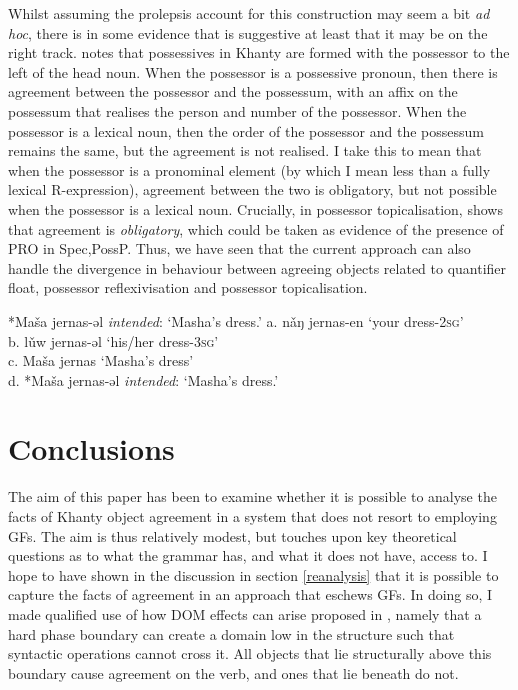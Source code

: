 \documentclass[output=paper
,modfonts
,nonflat]{langsci/langscibook}
\begin{document}
Whilst assuming the prolepsis account for this construction may seem a bit \emph{ad hoc}, there is in some evidence that is suggestive at least that it may be on the right track. 
\citet[][345]{nikolaeva1999} notes that possessives in Khanty are formed with the possessor to the left of the head noun. 
When the possessor is a possessive pronoun, then there is agreement between the possessor and the possessum, with an affix on the possessum that realises the person and number of the possessor.
When the possessor is a lexical noun, then the order of the possessor and the possessum remains the same, but the agreement is not realised.
I take this to mean that when the possessor is a pronominal element (by which I mean less than a fully lexical R-expression), agreement between the two is obligatory, but not possible when the possessor is a lexical noun. Crucially, in possessor topicalisation, \citeauthor{nikolaeva1999} shows that agreement is \emph{obligatory}, which could be taken as evidence of the presence of PRO in Spec,PossP.  
Thus, we have seen that the current approach can also handle the divergence in behaviour between agreeing objects related to quantifier float, possessor reflexivisation and possessor topicalisation.

\begin{exe}
	\ex
	\begin{tabbing}
		*Ma\v{s}a jernas-əl\hspace{10mm} \= \emph{intended}: `Masha's dress.'\kill
				a.	n\v{a}ŋ jernas-en			\> 	`your dress-\textsc{2sg}'\\
		b.	l\v{u}w jernas-əl 	\>	`his/her dress-\textsc{3sg}'\\
		c.	Ma\v{s}a jernas			\>	 `Masha's dress'\\
		d. 	*Ma\v{s}a jernas-əl	\>	 \emph{intended}: `Masha's dress.'\\
	\end{tabbing} 
\end{exe}

\section{Conclusions}\label{conclusion}

The aim of this paper has been to examine whether it is possible to analyse the facts of Khanty object agreement in a system that does not resort to employing GFs. 
The aim is thus relatively modest, but touches upon key theoretical questions as to what the grammar has, and what it does not have, access to.
I hope to have shown in the discussion in section \ref{reanalysis} that it is possible to capture the facts of agreement in an approach that eschews GFs. 
In doing so, I made qualified use of how DOM effects can arise proposed in \citet{Baker2015}, namely that a hard phase boundary can create a domain low in the structure such that syntactic operations cannot cross it.
All objects that lie structurally above this boundary cause agreement on the verb, and ones that lie beneath do not.
\end{document}
